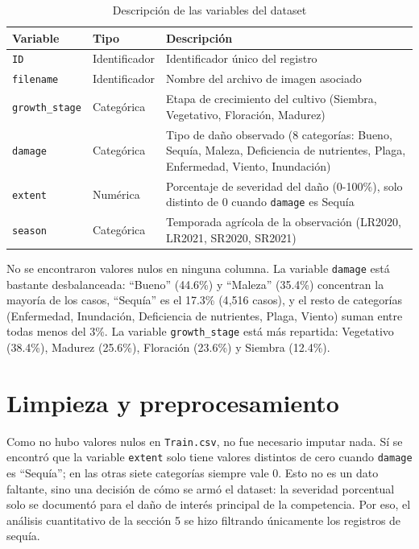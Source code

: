 \documentclass[11pt]{article}
\begin{document}
\begin{table}[htbp]
\centering
\caption{Descripción de las variables del dataset}
\begin{tabular}{@{}p{2.7cm}p{3cm}p{8cm}@{}}
\toprule
\textbf{Variable} & \textbf{Tipo} & \textbf{Descripción} \\
\midrule
\texttt{ID} & Identificador & Identificador único del registro \\
\texttt{filename} & Identificador & Nombre del archivo de imagen asociado \\
\texttt{growth\_stage} & Categórica & Etapa de crecimiento del cultivo (Siembra, Vegetativo, Floración, Madurez) \\
\texttt{damage} & Categórica & Tipo de daño observado (8 categorías: Bueno, Sequía, Maleza, Deficiencia de nutrientes, Plaga, Enfermedad, Viento, Inundación) \\
\texttt{extent} & Numérica & Porcentaje de severidad del daño (0-100\%), solo distinto de 0 cuando \texttt{damage} es Sequía \\
\texttt{season} & Categórica & Temporada agrícola de la observación (LR2020, LR2021, SR2020, SR2021) \\
\bottomrule
\end{tabular}
\end{table}

No se encontraron valores nulos en ninguna columna. La variable \texttt{damage} está bastante desbalanceada: ``Bueno'' (44.6\%) y ``Maleza'' (35.4\%) concentran la mayoría de los casos, ``Sequía'' es el 17.3\% (4{,}516 casos), y el resto de categorías (Enfermedad, Inundación, Deficiencia de nutrientes, Plaga, Viento) suman entre todas menos del 3\%. La variable \texttt{growth\_stage} está más repartida: Vegetativo (38.4\%), Madurez (25.6\%), Floración (23.6\%) y Siembra (12.4\%).

\section{Limpieza y preprocesamiento}

Como no hubo valores nulos en \texttt{Train.csv}, no fue necesario imputar nada. Sí se encontró que la variable \texttt{extent} solo tiene valores distintos de cero cuando \texttt{damage} es ``Sequía''; en las otras siete categorías siempre vale 0. Esto no es un dato faltante, sino una decisión de cómo se armó el dataset: la severidad porcentual solo se documentó para el daño de interés principal de la competencia. Por eso, el análisis cuantitativo de la sección 5 se hizo filtrando únicamente los registros de sequía.
\end{document}
